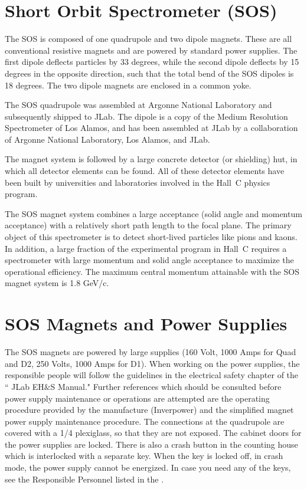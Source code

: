 
\section{Short Orbit Spectrometer (SOS) }

The SOS is composed of one quadrupole and two dipole magnets.
These are all conventional resistive magnets and are powered by standard
power supplies.
The first dipole deflects particles by 33 degrees, while the
second dipole deflects by 15 degrees in the opposite direction, such
that the total bend of the SOS dipoles is 18 degrees.
The two dipole magnets are enclosed in a common yoke.

The SOS quadrupole was assembled at Argonne National Laboratory and
subsequently shipped to JLab. The dipole is a copy of the Medium Resolution
Spectrometer of Los Alamos, and has been assembled at JLab by a collaboration
of Argonne National Laboratory, Los Alamos, and JLab.

The magnet system is followed by a large concrete detector (or shielding) hut,
in which all detector elements can be found. All of these
detector elements have been built by universities and laboratories involved 
in the Hall~C
physics program.

The SOS magnet system combines a large acceptance (solid angle and momentum
acceptance) with a relatively short path length to the focal plane.
The primary object of this spectrometer is to detect short-lived particles
like pions and kaons. In addition, a large fraction of the experimental
program in Hall~C requires a spectrometer with large momentum and solid angle
acceptance to maximize the operational efficiency.
The maximum central momentum attainable with the SOS magnet system is 1.8 GeV/c.

\section{SOS Magnets and Power Supplies }

The SOS magnets are powered by large supplies
(160 Volt, 1000 Amps for Quad and D2, 250 Volts, 1000 Amps for D1).
When working on the power supplies, the responsible people will follow
the guidelines in the electrical safety chapter of the `` JLab EH$\&$S
Manual." Further references which should be consulted before power supply
maintenance or operations are attempted are the operating procedure
provided by the manufacture (Inverpower) and the simplified magnet
power supply maintenance procedure.
The connections at the quadrupole are covered with a 1/4 plexiglass, so that they are not exposed.
The cabinet doors for the power supplies are locked.
There is also a crash button in the counting house which is interlocked with
a separate key. When the key is locked off, in crash mode, the power supply
cannot be energized.
In case you need any of the keys, see the Responsible Personnel listed in 
the .


